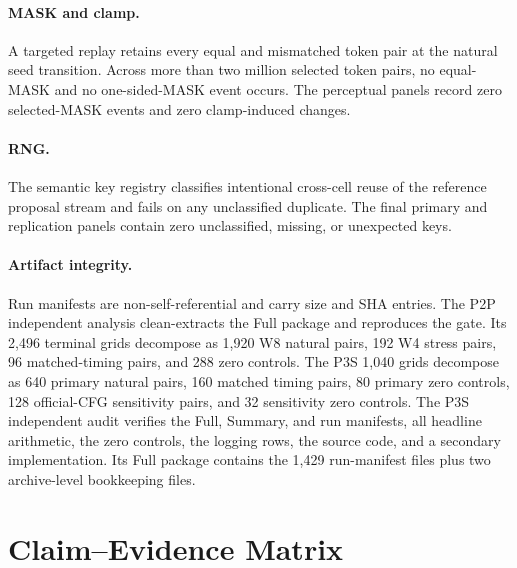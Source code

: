 \documentclass[11pt,a4paper]{article}
\theoremstyle{plain}
\theoremstyle{definition}
\theoremstyle{remark}
\begin{document}
\paragraph{MASK and clamp.} A targeted replay retains every equal and mismatched
token pair at the natural seed transition. Across more than two million selected
token pairs, no equal-MASK and no one-sided-MASK event occurs. The perceptual
panels record zero selected-MASK events and zero clamp-induced changes.

\paragraph{RNG.} The semantic key registry classifies intentional cross-cell
reuse of the reference proposal stream and fails on any unclassified duplicate.
The final primary and replication panels contain zero unclassified, missing, or
unexpected keys.

\paragraph{Artifact integrity.} Run manifests are non-self-referential and carry
size and SHA entries. The P2P independent analysis clean-extracts the Full
package and reproduces the gate. Its 2,496 terminal grids decompose as 1,920 W8
natural pairs, 192 W4 stress pairs, 96 matched-timing pairs, and 288 zero
controls. The P3S 1,040 grids decompose as 640 primary natural pairs, 160 matched
timing pairs, 80 primary zero controls, 128 official-CFG sensitivity pairs, and
32 sensitivity zero controls. The P3S independent audit verifies the Full,
Summary, and run manifests, all headline arithmetic, the zero controls, the
logging rows, the source code, and a secondary implementation. Its Full package
contains the 1,429 run-manifest files plus two archive-level bookkeeping files.

\section{Claim--Evidence Matrix}
\label{app:claims}
\end{document}
